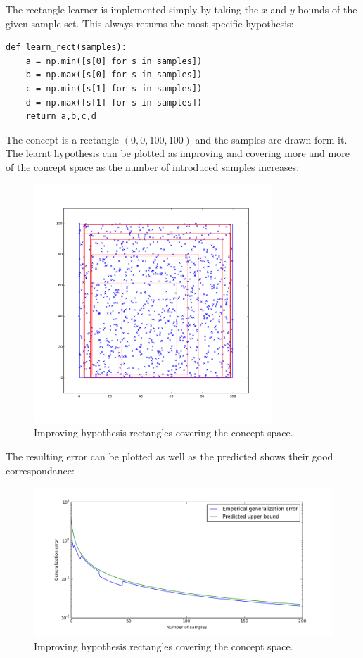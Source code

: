 \documentclass[a4paper, 12pt]{article}
\begin{document}
The rectangle learner is implemented simply by taking the $x$ and $y$ bounds of the given sample set. This always returns the most specific hypothesis:

\lstset{language=Python}   
\begin{lstlisting}[frame=single]
def learn_rect(samples):
    a = np.min([s[0] for s in samples])
    b = np.max([s[0] for s in samples])
    c = np.min([s[1] for s in samples])
    d = np.max([s[1] for s in samples])
    return a,b,c,d
\end{lstlisting}

The concept is a rectangle $(0,0,100,100)$ and the samples are drawn form it. The learnt hypothesis can be plotted as improving and covering more and more of the concept space as the number of introduced samples increases:
\clearpage

\begin{figure}[H]
  \centering
  \caption{Improving hypothesis rectangles covering the concept space.\label{fig:TriPoints}}
  \includegraphics[width=0.8\textwidth]{rect_1}
\end{figure}


The resulting error can be plotted as well as the predicted shows their good correspondance:

\begin{figure}[H]
  \centering
  \caption{Improving hypothesis rectangles covering the concept space.\label{fig:TriPoints}}
  \includegraphics[width=1.0\textwidth]{predict_vs_practical}
\end{figure}
\end{document}
